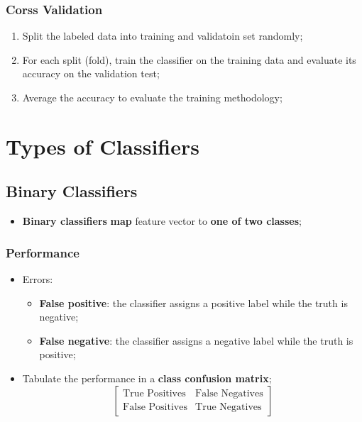     \subsubsection{Corss Validation}
    
      \begin{enumerate}
        \item Split the labeled data into training and validatoin set randomly;
        \item For each split (fold), train the classifier on the training data and evaluate its accuracy on the validation test;
        \item Average the accuracy to evaluate the training methodology;
      \end{enumerate}
  
\section{Types of Classifiers}

  \subsection{Binary Classifiers}
  
    \begin{itemize}
      \item \textbf{Binary classifiers} \textbf{map} feature vector to \textbf{one of two classes};
    \end{itemize}
    
    \subsubsection{Performance}
    
      \begin{itemize}
        \item Errors:
        \begin{itemize}
          \item \textbf{False positive}: the classifier assigns a positive label while the truth is negative;
          \item \textbf{False negative}: the classifier assigns a negative label while the truth is positive;
        \end{itemize}
        
        \item Tabulate the performance in a \textbf{class confusion matrix};
        \begin{equation}
          \begin{bmatrix}
            \text{True Positives} & \text{False Negatives} \\
            \text{False Positives} & \text{True Negatives}
          \end{bmatrix}
        \end{equation}
        
      \end{itemize}
    
